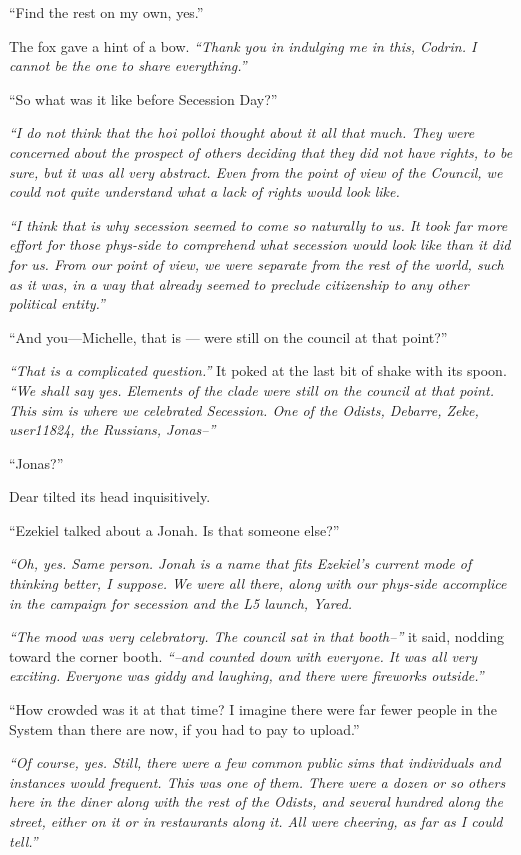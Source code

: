 ``Find the rest on my own, yes.''

The fox gave a hint of a bow. \emph{``Thank you in indulging me in this, Codrin. I cannot be the one to share everything.''}

``So what was it like before Secession Day?''

\emph{``I do not think that the hoi polloi thought about it all that much. They were concerned about the prospect of others deciding that they did not have rights, to be sure, but it was all very abstract. Even from the point of view of the Council, we could not quite understand what a lack of rights would look like.}

\emph{``I think that is why secession seemed to come so naturally to us. It took far more effort for those phys-side to comprehend what secession would look like than it did for us. From our point of view, we were separate from the rest of the world, such as it was, in a way that already seemed to preclude citizenship to any other political entity.''}

``And you---Michelle, that is — were still on the council at that point?''

\emph{``That is a complicated question.''} It poked at the last bit of shake with its spoon. \emph{``We shall say yes. Elements of the clade were still on the council at that point. This sim is where we celebrated Secession. One of the Odists, Debarre, Zeke, user11824, the Russians, Jonas--''}

``Jonas?''

Dear tilted its head inquisitively.

``Ezekiel talked about a Jonah. Is that someone else?''

\emph{``Oh, yes. Same person. Jonah is a name that fits Ezekiel's current mode of thinking better, I suppose. We were all there, along with our phys-side accomplice in the campaign for secession and the L5 launch, Yared.}

\emph{``The mood was very celebratory. The council sat in that booth--''} it said, nodding toward the corner booth. \emph{``--and counted down with everyone. It was all very exciting. Everyone was giddy and laughing, and there were fireworks outside.''}

``How crowded was it at that time? I imagine there were far fewer people in the System than there are now, if you had to pay to upload.''

\emph{``Of course, yes. Still, there were a few common public sims that individuals and instances would frequent. This was one of them. There were a dozen or so others here in the diner along with the rest of the Odists, and several hundred along the street, either on it or in restaurants along it. All were cheering, as far as I could tell.''}

